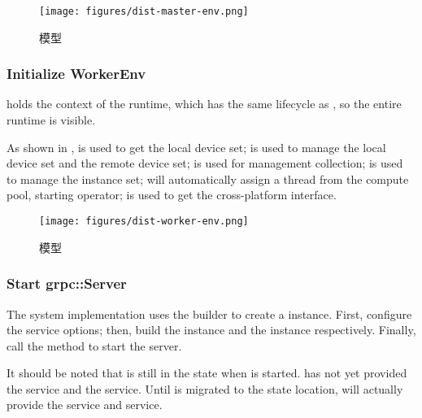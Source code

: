 \begin{content}
\begin{figure}[H]
\centering
\texttt{[image: figures/dist-master-env.png]}
\caption{模型}
 \label{fig:dist-master-env}
\end{figure}

\subsubsection{Initialize WorkerEnv}

 holds the context of the  runtime, which has the same lifecycle as , so the entire  runtime is visible.

As shown in ,  is used to get the local device set;  is used to manage the local device set and the remote device set;  is used for management  collection;  is used to manage the  instance set;  will automatically assign a thread from the compute pool, starting  operator;  is used to get the cross-platform  interface.

\begin{figure}[H]
\centering
\texttt{[image: figures/dist-worker-env.png]}
\caption{模型}
 \label{fig:dist-worker-env}
\end{figure}

\subsubsection{Start grpc::Server}

The system implementation uses the builder to create a  instance. First, configure the  service options; then, build the  instance and the  instance respectively. Finally, call the  method to start the  server.

It should be noted that  is still in the  state when  is started.
 has not yet provided the  service and the  service. Until  is migrated to the  state location,  will actually provide the  service and  service.


\end{content}
